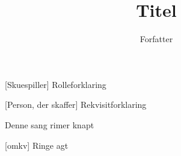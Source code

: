 \documentclass[a4paper,11pt]{article}
\title{Titel}
\author{Forfatter}
\begin{document}
\maketitle

\begin{roles}
    [Skuespiller] Rolleforklaring
\end{roles}

\begin{props}
    [Person, der skaffer] Rekvisitforklaring
\end{props}

\begin{song}
   Denne sang rimer knapt

  [omkv] Ringe agt

\end{song}
\end{document}

